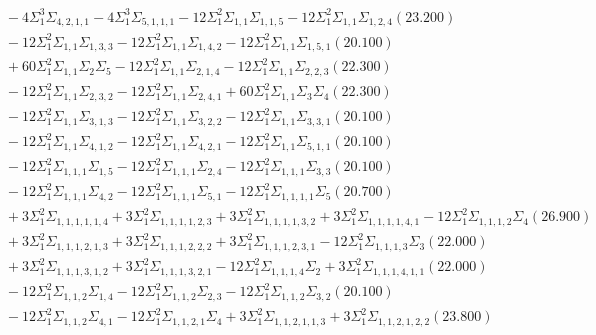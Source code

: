 \documentclass[12pt]{article}
\begin{document}
\begin{landscape}
\begin{align*}
		&\quad\quad -4\Sigma_{1}^{3}\Sigma_{4,2,1,1}-4\Sigma_{1}^{3}\Sigma_{5,1,1,1}-12\Sigma_{1}^{2}\Sigma_{1,1}\Sigma_{1,1,5}-12\Sigma_{1}^{2}\Sigma_{1,1}\Sigma_{1,2,4}(23.200) \\ 
		&\quad\quad -12\Sigma_{1}^{2}\Sigma_{1,1}\Sigma_{1,3,3}-12\Sigma_{1}^{2}\Sigma_{1,1}\Sigma_{1,4,2}-12\Sigma_{1}^{2}\Sigma_{1,1}\Sigma_{1,5,1}(20.100) \\ 
		&\quad\quad +60\Sigma_{1}^{2}\Sigma_{1,1}\Sigma_{2}\Sigma_{5}-12\Sigma_{1}^{2}\Sigma_{1,1}\Sigma_{2,1,4}-12\Sigma_{1}^{2}\Sigma_{1,1}\Sigma_{2,2,3}(22.300) \\ 
		&\quad\quad -12\Sigma_{1}^{2}\Sigma_{1,1}\Sigma_{2,3,2}-12\Sigma_{1}^{2}\Sigma_{1,1}\Sigma_{2,4,1}+60\Sigma_{1}^{2}\Sigma_{1,1}\Sigma_{3}\Sigma_{4}(22.300) \\ 
		&\quad\quad -12\Sigma_{1}^{2}\Sigma_{1,1}\Sigma_{3,1,3}-12\Sigma_{1}^{2}\Sigma_{1,1}\Sigma_{3,2,2}-12\Sigma_{1}^{2}\Sigma_{1,1}\Sigma_{3,3,1}(20.100) \\ 
		&\quad\quad -12\Sigma_{1}^{2}\Sigma_{1,1}\Sigma_{4,1,2}-12\Sigma_{1}^{2}\Sigma_{1,1}\Sigma_{4,2,1}-12\Sigma_{1}^{2}\Sigma_{1,1}\Sigma_{5,1,1}(20.100) \\ 
		&\quad\quad -12\Sigma_{1}^{2}\Sigma_{1,1,1}\Sigma_{1,5}-12\Sigma_{1}^{2}\Sigma_{1,1,1}\Sigma_{2,4}-12\Sigma_{1}^{2}\Sigma_{1,1,1}\Sigma_{3,3}(20.100) \\ 
		&\quad\quad -12\Sigma_{1}^{2}\Sigma_{1,1,1}\Sigma_{4,2}-12\Sigma_{1}^{2}\Sigma_{1,1,1}\Sigma_{5,1}-12\Sigma_{1}^{2}\Sigma_{1,1,1,1}\Sigma_{5}(20.700) \\ 
		&\quad\quad +3\Sigma_{1}^{2}\Sigma_{1,1,1,1,1,4}+3\Sigma_{1}^{2}\Sigma_{1,1,1,1,2,3}+3\Sigma_{1}^{2}\Sigma_{1,1,1,1,3,2}+3\Sigma_{1}^{2}\Sigma_{1,1,1,1,4,1}-12\Sigma_{1}^{2}\Sigma_{1,1,1,2}\Sigma_{4}(26.900) \\ 
		&\quad\quad +3\Sigma_{1}^{2}\Sigma_{1,1,1,2,1,3}+3\Sigma_{1}^{2}\Sigma_{1,1,1,2,2,2}+3\Sigma_{1}^{2}\Sigma_{1,1,1,2,3,1}-12\Sigma_{1}^{2}\Sigma_{1,1,1,3}\Sigma_{3}(22.000) \\ 
		&\quad\quad +3\Sigma_{1}^{2}\Sigma_{1,1,1,3,1,2}+3\Sigma_{1}^{2}\Sigma_{1,1,1,3,2,1}-12\Sigma_{1}^{2}\Sigma_{1,1,1,4}\Sigma_{2}+3\Sigma_{1}^{2}\Sigma_{1,1,1,4,1,1}(22.000) \\ 
		&\quad\quad -12\Sigma_{1}^{2}\Sigma_{1,1,2}\Sigma_{1,4}-12\Sigma_{1}^{2}\Sigma_{1,1,2}\Sigma_{2,3}-12\Sigma_{1}^{2}\Sigma_{1,1,2}\Sigma_{3,2}(20.100) \\ 
		&\quad\quad -12\Sigma_{1}^{2}\Sigma_{1,1,2}\Sigma_{4,1}-12\Sigma_{1}^{2}\Sigma_{1,1,2,1}\Sigma_{4}+3\Sigma_{1}^{2}\Sigma_{1,1,2,1,1,3}+3\Sigma_{1}^{2}\Sigma_{1,1,2,1,2,2}(23.800) \\ 

\end{align*}
\end{landscape}
\end{document}
